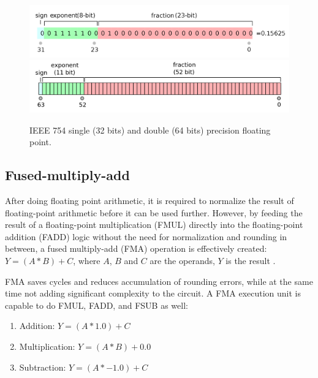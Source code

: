\documentclass[logo,bsc,singlespacing,parskip]{infthesis}
\newenvironment{compactlist}
{ \begin{enumerate}
    \setlength{\itemsep}{0pt}
    \setlength{\parskip}{0pt}
    \setlength{\parsep}{0pt}     
}
{ \end{enumerate} }
\begin{document}
\begin{figure}
    \includegraphics[width=\linewidth]{image/ieee-f32.png}
    \includegraphics[width=\linewidth]{image/ieee-f64.png}
    \caption{IEEE 754 single (32 bits) and double (64 bits) precision floating
    point. \cite{ieee754-diagram}}
    \label{fig:ieee-f32}
\end{figure}


\subsection{Fused-multiply-add}
\label{sec:FMA}

After doing floating point arithmetic, it is required to normalize the result of
floating-point arithmetic before it can be used further. However, by feeding the
result of a floating-point multiplication (FMUL) directly into the
floating-point addition (FADD) logic without the need for normalization and
rounding in between, a fused multiply-add (FMA) operation is effectively
created: 
\begin{math}Y = (A * B) + C \end{math}, where 
\begin{math}A\end{math},
\begin{math}B\end{math} and
\begin{math}C\end{math} are the operands, 
 \begin{math}Y\end{math} is the result \cite{CARD}.

FMA saves cycles and reduces accumulation of rounding errors, while at the same
time not adding significant complexity to the circuit. A FMA execution unit is
capable to do FMUL, FADD, and FSUB as well: 
\begin{compactlist} 
\item[] Addition: \begin{math}Y = (A * 1.0) + C \end{math} 
\item[] Multiplication: \begin{math} Y = (A * B) + 0.0 \end{math} 
\item[] Subtraction: \begin{math} Y = (A * -1.0) + C\end{math} 
\end{compactlist} 
\end{document}
